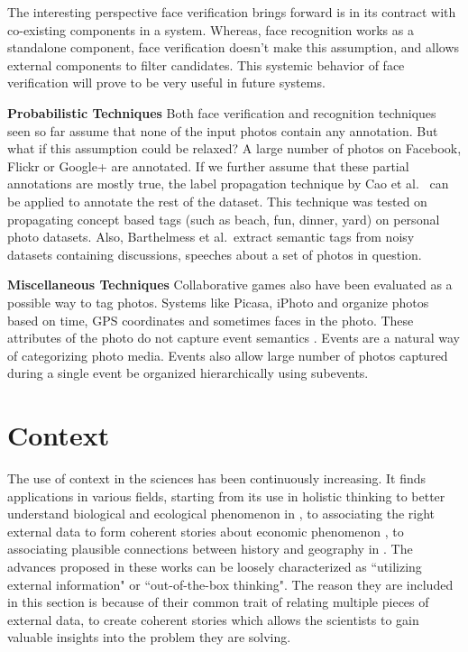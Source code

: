 The interesting perspective face verification brings forward is in its contract with co-existing components in a system. Whereas, face recognition works as a standalone component, face verification doesn't make this assumption, and allows external components to filter candidates. This systemic behavior of face verification will prove to be very useful in future systems.

\textbf{Probabilistic Techniques}
Both face verification and recognition techniques seen so far assume that none of the input photos contain any annotation. But what if this assumption could be relaxed? A large number of photos on Facebook, Flickr or Google+ are annotated. If we further assume that these partial annotations are mostly true, the label propagation technique by Cao et al.\ \cite{cao2008annotating} can be applied to annotate the rest of the dataset. This technique was tested on propagating concept based tags (such as beach, fun, dinner, yard) on personal photo datasets. Also, Barthelmess et al.\ extract semantic tags from noisy datasets containing discussions, speeches about a set of photos in question\cite{barthelmess2007toward}. 

\textbf{Miscellaneous Techniques}
Collaborative games also have been evaluated as a possible way to tag photos\cite{diakopoulos2007photoplay}. Systems like Picasa, iPhoto and \cite{graham2002time} organize photos based on time, GPS coordinates and sometimes faces in the photo. These attributes of the photo do not capture event semantics \cite{sawant2011automatic}. Events are a natural way of categorizing photo media. Events also allow large number of photos captured during a single event be organized hierarchically using subevents.

\section{Context}
The use of context in the sciences has been continuously increasing. It finds applications in various fields, starting from its use in holistic thinking to better understand biological and ecological phenomenon in \cite{capra1997web}, to associating the right external data to form coherent stories about economic phenomenon \cite{levitt2006freakonomics}, to associating plausible connections between history and geography in \cite{diamond1997guns}. The advances proposed in these works can be loosely characterized as ``utilizing external information" or ``out-of-the-box thinking". The reason they are included in this section is because of their common trait of relating multiple pieces of external data, to create coherent stories which allows the scientists to gain valuable insights into the problem they are solving.

